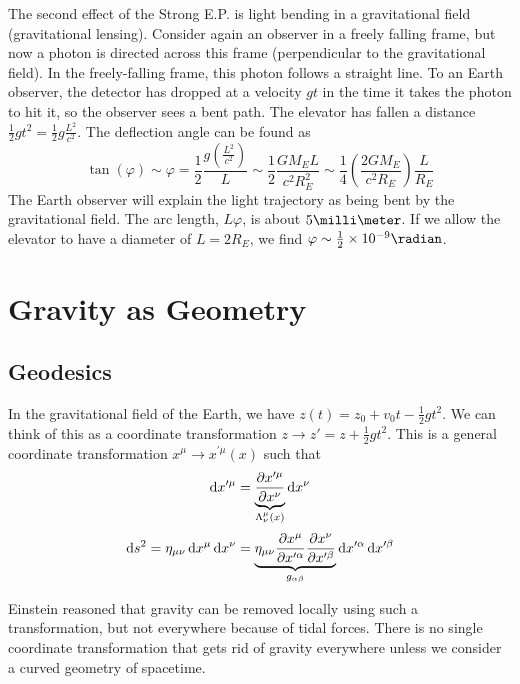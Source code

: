 \documentclass[a4paper,twoside,master.tex]{subfiles}
\begin{document}
The second effect of the Strong E.P. is light bending in a gravitational field (gravitational lensing). Consider again an observer in a freely falling frame, but now a photon is directed across this frame (perpendicular to the gravitational field). In the freely-falling frame, this photon follows a straight line. To an Earth observer, the detector has dropped at a velocity $ g t $ in the time it takes the photon to hit it, so the observer sees a bent path. The elevator has fallen a distance $ \frac{1}{2} g t^2 = \frac{1}{2} g \frac{L^2}{c^2} $. The deflection angle can be found as
\begin{equation}
    \tan(\varphi) \sim \varphi = \frac{1}{2} \frac{g \left( \frac{L^2}{c^2} \right)}{L} \sim \frac{1}{2} \frac{G M_E L}{c^2 R_E^2} \sim \frac{1}{4} \left( \frac{2 G M_E}{c^2 R_E} \right) \frac{L}{R_E}
\end{equation}
The Earth observer will explain the light trajectory as being bent by the gravitational field. The arc length, $ L \varphi $, is about $ 5\milli\meter $. If we allow the elevator to have a diameter of $ L = 2 R_E $, we find $ \varphi \sim \frac{1}{2} \times 10^{-9} \radian $.


\section{Gravity as Geometry}\label{sec:gravity_as_geometry}

\subsection{Geodesics}\label{sub:geodesics}

In the gravitational field of the Earth, we have $ z(t) = z_0 + v_0 t - \frac{1}{2} g t^2 $. We can think of this as a coordinate transformation $ z \to z' = z + \frac{1}{2} g t^2 $. This is a general coordinate transformation $ x^{\mu} \to x^{\prime \mu}(x) $ such that
\begin{equation}
    \dd{x^{\prime \mu}} = \underbrace{\pdv{x^{\prime \mu}}{x^{\nu}}}_{\Lambda^{\mu}_{\nu}(x)} \dd{x^{\nu}}
\end{equation}
\begin{equation}
    \dd{s^2} = \eta_{\mu \nu} \dd{x^{\mu}} \dd{x^{\nu}} = \underbrace{\eta_{\mu \nu} \pdv{x^{\mu}}{x^{\prime \alpha}}\pdv{x^{\nu}}{x^{\prime \beta}}}_{g_{\alpha \beta}} \dd{x^{\prime \alpha}} \dd{x^{\prime \beta}}
\end{equation}

Einstein reasoned that gravity can be removed locally using such a transformation, but not everywhere because of tidal forces. There is no single coordinate transformation that gets rid of gravity everywhere unless we consider a curved geometry of spacetime.
\end{document}
